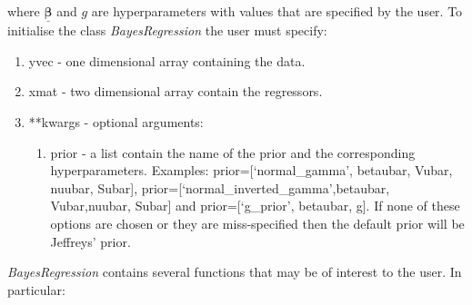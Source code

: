 \documentclass[article]{jss}
\begin{document}
where $\bm{\underline{\beta}}$ and $g$ are hyperparameters with
values that are specified by the user. To initialise the class \emph{BayesRegression}
the user must specify: 
\begin{enumerate}
\item yvec - one dimensional  array containing the data. 
\item xmat - two dimensional  array contain the regressors.
\item {*}{*}kwargs - optional arguments:

\begin{enumerate}
\item prior - a list contain the name of the prior and the
  corresponding hyperparameters. Examples: prior={[}`normal\_gamma',
  betaubar, Vubar, nuubar, Subar{]},
  prior={[}`normal\_inverted\_gamma',betaubar, Vubar,nuubar, Subar{]}
  and prior={[}`g\_prior', betaubar, g{]}. If none of these options
  are chosen or they are miss-specified then the default prior will be
  Jeffreys' prior.
\end{enumerate}
\end{enumerate}
\emph{BayesRegression }contains several functions that may be of interest
to the user. In particular: 
\end{document}
